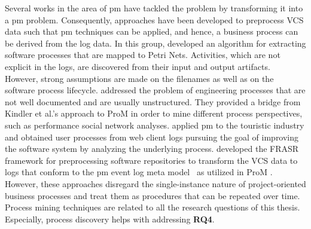 Several works in the area of \gls{pm} have tackled the problem by transforming it into a \gls{pm} problem. 
Consequently, approaches have been developed to preprocess VCS data such that \gls{pm} techniques can be applied, and hence, a business process can be derived from the log data.
In this group, \citep{kindler2006activity,kindler2006incremental} developed an algorithm for extracting software processes that are mapped to Petri Nets. Activities, which are not explicit in the logs, are discovered from their input and output artifacts. However, strong assumptions are made on the filenames as well as on the software process lifecycle. %
\citep{rubin2007process} addressed the problem of engineering processes that are not well documented and are usually unstructured. They provided a bridge from Kindler et al.'s approach to ProM \citep{van2005prom} in order to mine different process perspectives, such as performance social network analyses. %
\citep{rubin2014agile} applied \gls{pm} to the touristic industry and obtained user processes from web client logs pursuing the goal of improving the software system by analyzing the underlying process.
\citep{Poncin2011a} developed the FRASR framework for preprocessing software repositories to transform the VCS data to logs that conform to the \gls{pm} event log meta model~\citep{van2005meta} as utilized in ProM \citep{van2005prom}.
However, these approaches disregard the single-instance nature of project-oriented business processes and treat them as procedures that can be repeated over time.
Process mining techniques are related to all the research questions of this thesis. Especially, process discovery helps with addressing \textbf{RQ4}.

